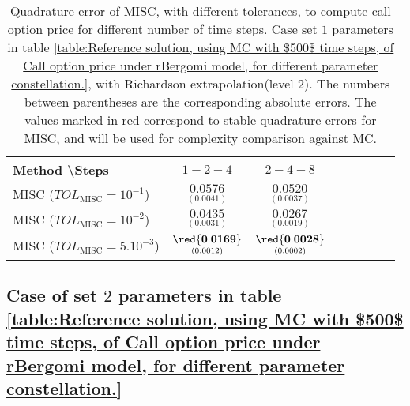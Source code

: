 \begin{table}[!h]
	\centering
	\begin{tabular}{l*{6}{c}r}
		Method \textbackslash  Steps            & $1-2-4$ & $2-4-8$  \\
		\hline
		MISC ($TOL_{\text{MISC}}=10^{-1}$)  & $\underset{(   0.0041)}{\mathbf{  0.0576}}$ & $\underset{(0.0037)}{\mathbf{0.0520}}$  \\
		MISC ($TOL_{\text{MISC}}=10^{-2}$)  & $\underset{(0.0031)}{\mathbf{0.0435}}$ &    $\underset{(0.0019)}{\mathbf{0.0267}}$   \\
		
		MISC ($TOL_{\text{MISC}}=5.10^{-3}$)  & $\underset{(0.0012)}{\mathbf{
				\red{0.0169}}}$ &    $\underset{(0.0002
			)}{\mathbf{\red{ 0.0028}}}$ \\
%		
%			
		\hline
	\end{tabular}
	\caption{Quadrature error of MISC, with different tolerances, to compute call option price for different number of time steps. Case set $1$ parameters in table \ref{table:Reference solution, using MC with $500$ time steps, of Call option price under rBergomi model, for different parameter constellation.}, with Richardson extrapolation(level $2$). The numbers between parentheses are the corresponding absolute errors. The values marked in red correspond to stable quadrature errors for MISC, and will be used for complexity comparison against MC.}
	\label{Quadrature error of MISC to compute Call option price of the different tolerances for different number of time steps. Case set $1$ parameters, with Richardson extrapolation(level $2$). The numbers between parentheses are the corresponding absolute errors.}
\end{table}


\FloatBarrier


\subsection{Case of set $2$ parameters in table \ref{table:Reference solution, using MC with $500$ time steps, of Call option price under rBergomi model, for different parameter constellation.} }
\label{appendix:Case of set $2$ parameters_linear}



